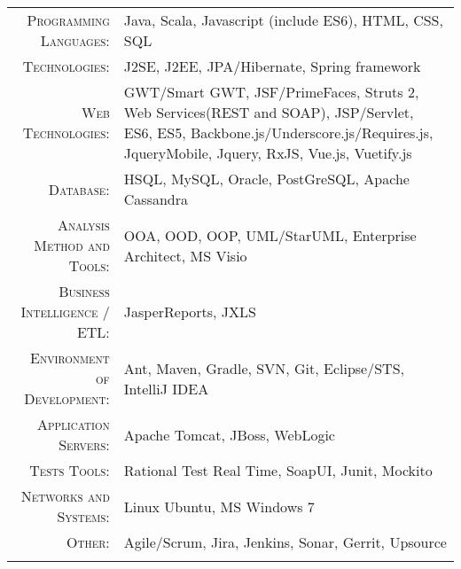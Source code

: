 %
%
%

\renewcommand{\arraystretch}{1.1}

	\begin{tabular}{>{}r>{}p{13cm}} 
\textsc{Programming Languages:} & Java, Scala, Javascript (include ES6), HTML, CSS, SQL\\ 
\textsc{Technologies:} & J2SE, J2EE, JPA/Hibernate, Spring framework\\ 
\textsc{Web Technologies:} & GWT/Smart GWT,  JSF/PrimeFaces, Struts 2, Web Services(REST and SOAP), JSP/Servlet, ES6, ES5, Backbone.js/Underscore.js/Requires.js, JqueryMobile, Jquery, RxJS, Vue.js, Vuetify.js\\ 
\textsc{Database:} & HSQL,  MySQL, Oracle, PostGreSQL, Apache Cassandra\\ 
\textsc{Analysis Method and Tools:} & OOA,  OOD, OOP, UML/StarUML, Enterprise Architect, MS Visio\\ 
\textsc{Business Intelligence / ETL:} & JasperReports, JXLS\\ 
\textsc{Environment of Development:} & Ant, Maven, Gradle, SVN, Git, Eclipse/STS, IntelliJ IDEA\\ 
\textsc{Application Servers:} & Apache Tomcat, JBoss, WebLogic\\
\textsc{Tests Tools:} & Rational Test Real Time, SoapUI, Junit, Mockito\\
\textsc{Networks and Systems:} & Linux Ubuntu, MS Windows 7\\
\textsc{Other:} & Agile/Scrum, Jira, Jenkins, Sonar, Gerrit, Upsource\\
\newline
    \end{tabular}
    